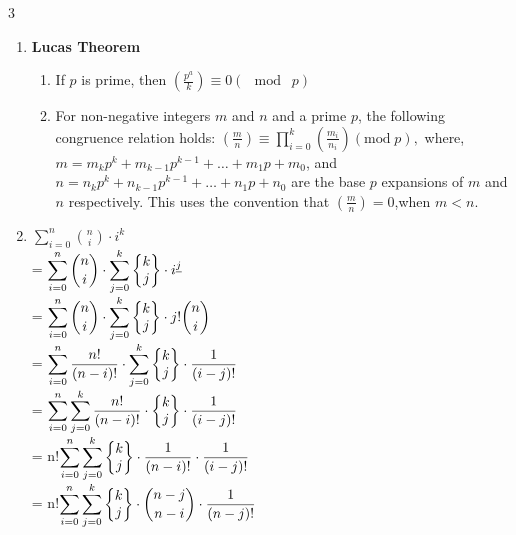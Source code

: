 \documentclass[8pt,a4paper,onesided]{article}
\begin{document}
\begin{multicols}{3}
\begin{enumerate}
\[\begin{cases}
    \end{cases}\]
    Here $\displaystyle F(n, k) = n \cdot (n - 1) \cdot \dots \cdot (n - k + 1)$
    \item \textbf{Lucas Theorem}
    \begin{enumerate}
      \item If $\displaystyle p$ is prime, then $\displaystyle \left(\frac{p^{a}}{k}\right) \equiv 0 (\mod\; p)$
      \item For non-negative integers $m$ and $n$ and a prime $\displaystyle p$, the following congruence relation holds:
      \(\displaystyle \left(\frac{m}{n}\right) \equiv \prod_{i=0}^{k} \left(\frac{m_{i}}{n_{i}}\right) (\text{mod}\; p),\)
      where,
      $m=m_{k} p^{k} +m_{k-1} p^{k-1}+\dots+m_{1} p+m_{0}$,
      and
      $n=n_{k}p^{k}+n_{k-1}p^{k-1}+\dots+n_{1}p+n_{0}$
      are the base $\displaystyle p$ expansions of $m$ and $n$ respectively. This uses the convention that $\displaystyle \left(\frac{m}{n}\right)=0$,when $m<n$.
    \end{enumerate}
    \item $\displaystyle \sum_{i=0}^{n}  {n \choose i } \cdot i^{k}$
    \\= $\displaystyle \sum_{i=0}^{n}  {n \choose i } \cdot \sum_{j=0}^{k}{ \left\{ \begin{matrix} k\cr j \end{matrix} \right\} \cdot i^{\underline{j}}}$
    \\= $\displaystyle \sum_{i=0}^{n} {n \choose i } \cdot \sum_{j=0}^{k} \left\{ \begin{matrix} k\cr j \end{matrix} \right\} \cdot  j! {n \choose i }$
    \\= $\displaystyle \sum_{i=0}^{n} \frac{n!}{(n-i)!} \cdot \sum_{j=0}^{k} \left\{ \begin{matrix}k\cr j \end{matrix} \right\} \cdot \frac{1}{(i-j)!}$
    \\= $\displaystyle \sum_{i=0}^{n} \sum_{j=0}^{k} \frac{n!}{(n-i)!} \cdot  \left\{\begin{matrix} k\cr j \end{matrix} \right\} \cdot \frac{1}{(i-j)!}$
    \\= n!$\displaystyle \sum_{i=0}^{n} \sum_{j=0}^{k} \left\{ \begin{matrix} k\cr j \end{matrix} \right\} \cdot \frac{1}{(n-i)!} \cdot \frac{1}{(i-j)!}$
    \\= n!$\displaystyle \sum_{i=0}^{n} \sum_{j=0}^{k} \left\{ \begin{matrix} k\cr j \end{matrix} \right\} \cdot { n-j \choose n-i} \cdot \frac{1}{(n-j)!}$

\end{enumerate}
\end{multicols}
\end{document}
